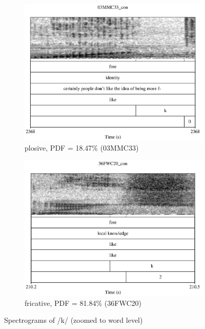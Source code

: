 	\begin{figure}[h!]
		
		\begin{subfigure}{0.75\textwidth}
			
			\includegraphics[width=\textwidth]{figures/like_plosive}
			\caption{plosive, PDF = 18.47\% (03MMC33)}
		\end{subfigure}
		\begin{subfigure}{0.75\textwidth}
			
			\includegraphics[width=\textwidth]{figures/like_fricative}
			\caption{fricative, PDF = 81.84\% (36FWC20)}
		\end{subfigure}
		\caption{Spectrograms of /k/ (zoomed to word level)}
		\label{fig.automatic.consonants}
	\end{figure}


